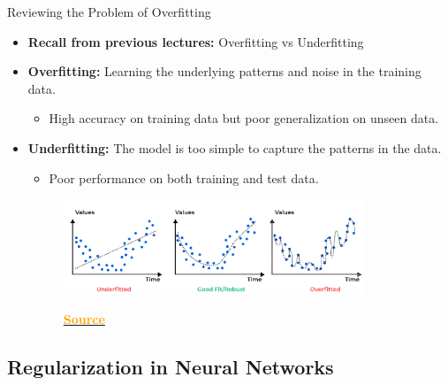 \documentclass[serif, aspectratio=169]{beamer}
\begin{document}
\begin{frame}{Reviewing the Problem of Overfitting}
    \begin{itemize} 
    
        \item \textbf{Recall from previous lectures:} Overfitting vs Underfitting
        
        \item \textbf{Overfitting:} Learning the underlying patterns and noise in the training data.
        \begin{itemize}
            \item High accuracy on training data but poor generalization on unseen data.
        \end{itemize}  

        \item \textbf{Underfitting:} The model is too simple to capture the patterns in the data.
        \begin{itemize}
            \item Poor performance on both training and test data.
        \end{itemize}

        \begin{figure}
                \includegraphics[width=0.85\textwidth]{pic/overfitting-vs-underfitting__AIE.png}
                \label{fig:overfitting-vs-underfitting}
                \caption{\href{https://analystprep.com/study-notes/cfa-level-2/quantitative-method/overfitting-methods-addressing/}{\textcolor{orange}{\textbf{Source}}}}
        \end{figure}

    \end{itemize} 
\end{frame}

\subsection{Regularization in Neural Networks}
\end{document}
